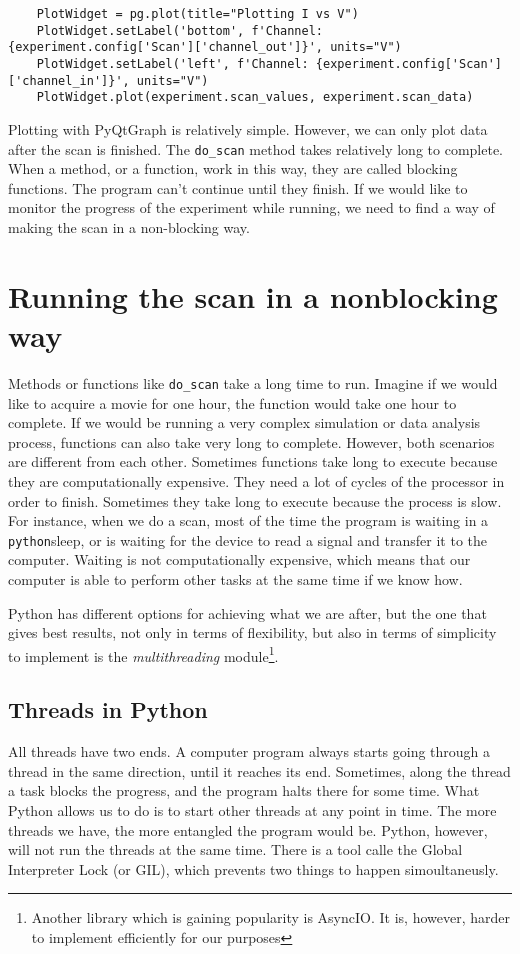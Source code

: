 \begin{verbatim}
    PlotWidget = pg.plot(title="Plotting I vs V")
    PlotWidget.setLabel('bottom', f'Channel: {experiment.config['Scan']['channel_out']}', units="V")
    PlotWidget.setLabel('left', f'Channel: {experiment.config['Scan']['channel_in']}', units="V")
    PlotWidget.plot(experiment.scan_values, experiment.scan_data)
\end{verbatim}

Plotting with PyQtGraph is relatively simple. However, we can only plot data after the scan is finished. The \texttt{do\_scan} method takes relatively long to complete. When a method, or a function, work in this way, they are called blocking functions. The program can't continue until they finish. If we would like to monitor the progress of the experiment while running, we need to find a way of making the scan in a non-blocking way.

\section{Running the scan in a nonblocking way}\label{section:nonblocking}
Methods or functions like \texttt{do_scan} take a long time to run. Imagine if we would like to acquire a movie for one hour, the function would take one hour to complete. If we would be running a very complex simulation or data analysis process, functions can also take very long to complete. However, both scenarios are different from each other. Sometimes functions take long to execute because they are computationally expensive. They need a lot of cycles of the processor in order to finish. Sometimes they take long to execute because the process is slow. For instance, when we do a scan, most of the time the program is waiting in a \texttt{python}{sleep}, or is waiting for the device to read a signal and transfer it to the computer. Waiting is not computationally expensive, which means that our computer is able to perform other tasks at the same time if we know how.

Python has different options for achieving what we are after, but the one that gives best results, not only in terms of flexibility, but also in terms of simplicity to implement is the \emph{multithreading} module\footnote{Another library which is gaining popularity is AsyncIO. It is, however, harder to implement efficiently for our purposes}.

\subsection{Threads in Python}\label{subsection:multithreading}
All threads have two ends. A computer program always starts going through a thread in the same direction, until it reaches its end. Sometimes, along the thread a task blocks the progress, and the program halts there for some time. What Python allows us to do is to start other threads at any point in time. The more threads we have, the more entangled the program would be. Python, however, will not run the threads at the same time. There is a tool calle the Global Interpreter Lock (or GIL), which prevents two things to happen simoultaneusly.

